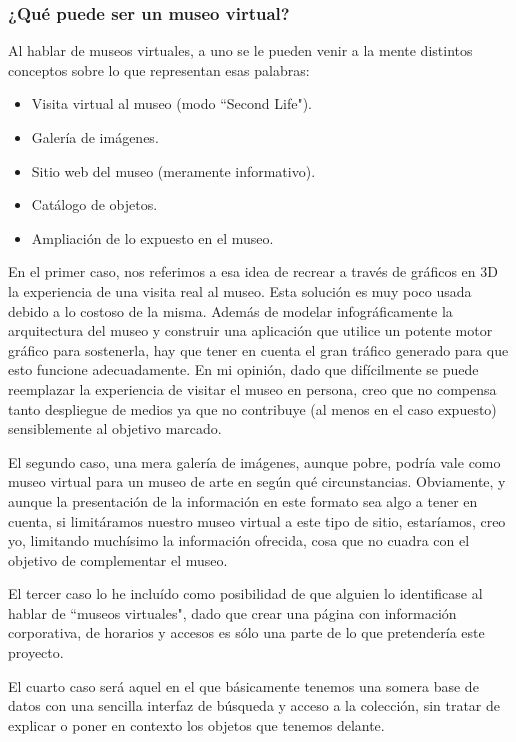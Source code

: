 \subsubsection{¿Qué puede ser un museo virtual?}
\par Al hablar de museos virtuales, a uno se le pueden venir a la mente distintos conceptos sobre lo que representan esas palabras:

\begin{itemize}
\item Visita virtual al museo (modo ``Second Life").
\item Galería de imágenes.
\item Sitio web del museo (meramente informativo).
\item Catálogo de objetos.
\item Ampliación de lo expuesto en el museo.
\end{itemize}

\par En el primer caso, nos referimos a esa idea de recrear a través de gráficos en 3D la experiencia de una visita real al museo. Esta solución es muy poco usada debido a lo costoso de la misma. Además de modelar infográficamente la arquitectura del museo y construir una aplicación que utilice un potente motor gráfico para sostenerla, hay que tener en cuenta el gran tráfico generado para que esto funcione adecuadamente. En mi opinión, dado que difícilmente se puede reemplazar la experiencia de visitar el museo en persona, creo que no compensa tanto despliegue de medios ya que no contribuye (al menos en el caso expuesto) sensiblemente al objetivo marcado.

\par El segundo caso, una mera galería de imágenes, aunque pobre, podría vale como museo virtual para un museo de arte en según qué circunstancias. Obviamente, y aunque la presentación de la información en este formato sea algo a tener en cuenta, si limitáramos nuestro museo virtual a este tipo de sitio, estaríamos, creo yo, limitando muchísimo la información ofrecida, cosa que no cuadra con el objetivo de complementar el museo.

\par El tercer caso lo he incluído como posibilidad de que alguien lo identificase al hablar de ``museos virtuales", dado que crear una página con información corporativa, de horarios y accesos es sólo una parte de lo que pretendería este proyecto.

\par El cuarto caso será aquel en el que básicamente tenemos una somera base de datos con una sencilla interfaz de búsqueda y acceso a la colección, sin tratar de explicar o poner en contexto los objetos que tenemos delante.

